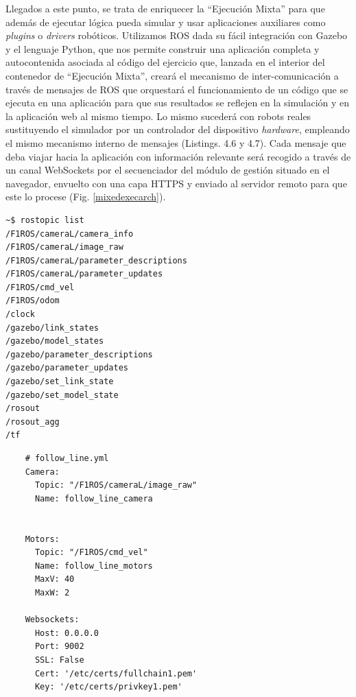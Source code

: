 Llegados a este punto, se trata de enriquecer la ``Ejecución Mixta'' para que además de ejecutar lógica pueda simular y usar aplicaciones auxiliares como \textit{plugins} o \textit{drivers} robóticos. Utilizamos ROS dada su fácil integración con Gazebo y el lenguaje Python, que nos permite construir una aplicación completa y autocontenida asociada al código del ejercicio que, lanzada en el interior del contenedor de ``Ejecución Mixta'', creará el mecanismo de inter-comunicación a través de mensajes de ROS que orquestará el funcionamiento de un código que se ejecuta en una aplicación para que sus resultados se reflejen en la simulación y en la aplicación web al mismo tiempo. Lo mismo sucederá con robots reales sustituyendo el simulador por un controlador del dispositivo \textit{hardware}, empleando el mismo mecanismo interno de mensajes (Listings. 4.6 y 4.7). Cada mensaje que deba viajar hacia la aplicación con información relevante será recogido a través de un canal WebSockets por el secuenciador del módulo de gestión situado en el navegador, envuelto con una capa HTTPS y enviado al servidor remoto para que este lo procese (Fig. \ref{mixedexecarch}).

\begin{lstlisting}[language=bash, caption=Topics de ROS asociados a los Canales de Comunicación Internos]
~$ rostopic list
/F1ROS/cameraL/camera_info
/F1ROS/cameraL/image_raw
/F1ROS/cameraL/parameter_descriptions
/F1ROS/cameraL/parameter_updates
/F1ROS/cmd_vel
/F1ROS/odom
/clock
/gazebo/link_states
/gazebo/model_states
/gazebo/parameter_descriptions
/gazebo/parameter_updates
/gazebo/set_link_state
/gazebo/set_model_state
/rosout
/rosout_agg
/tf
\end{lstlisting}

\begin{verbatim}
    # follow_line.yml
    Camera:
      Topic: "/F1ROS/cameraL/image_raw" 
      Name: follow_line_camera
    
    
    Motors:
      Topic: "/F1ROS/cmd_vel"
      Name: follow_line_motors
      MaxV: 40
      MaxW: 2
    
    Websockets:
      Host: 0.0.0.0 
      Port: 9002
      SSL: False
      Cert: '/etc/certs/fullchain1.pem' 
      Key: '/etc/certs/privkey1.pem'
\end{verbatim}
\begin{lstlisting}[caption=Configuración de Canales del Secuenciador en formato YAML]
\end{lstlisting}

